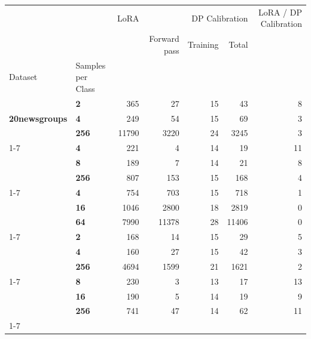 \begin{tabular}{llrrrrr}
\toprule
 &  & LoRA & \multicolumn{3}{r}{DP Calibration} & LoRA / DP Calibration \\
 &  &  & Forward pass & Training & Total &  \\
Dataset & Samples
per
Class &  &  &  &  &  \\
\midrule
\multirow[t]{3}{*}{\textbf{20newsgroups}} & \textbf{2} & 365 & 27 & 15 & 43 & 8 \\
\textbf{} & \textbf{4} & 249 & 54 & 15 & 69 & 3 \\
\textbf{} & \textbf{256} & 11790 & 3220 & 24 & 3245 & 3 \\
\cline{1-7}
\multirow[t]{3}{*}{\textbf{agnews}} & \textbf{4} & 221 & 4 & 14 & 19 & 11 \\
\textbf{} & \textbf{8} & 189 & 7 & 14 & 21 & 8 \\
\textbf{} & \textbf{256} & 807 & 153 & 15 & 168 & 4 \\
\cline{1-7}
\multirow[t]{3}{*}{\textbf{banking77}} & \textbf{4} & 754 & 703 & 15 & 718 & 1 \\
\textbf{} & \textbf{16} & 1046 & 2800 & 18 & 2819 & 0 \\
\textbf{} & \textbf{64} & 7990 & 11378 & 28 & 11406 & 0 \\
\cline{1-7}
\multirow[t]{3}{*}{\textbf{dbpedia}} & \textbf{2} & 168 & 14 & 15 & 29 & 5 \\
\textbf{} & \textbf{4} & 160 & 27 & 15 & 42 & 3 \\
\textbf{} & \textbf{256} & 4694 & 1599 & 21 & 1621 & 2 \\
\cline{1-7}
\multirow[t]{3}{*}{\textbf{sst2}} & \textbf{8} & 230 & 3 & 13 & 17 & 13 \\
\textbf{} & \textbf{16} & 190 & 5 & 14 & 19 & 9 \\
\textbf{} & \textbf{256} & 741 & 47 & 14 & 62 & 11 \\
\cline{1-7}
\bottomrule
\end{tabular}
